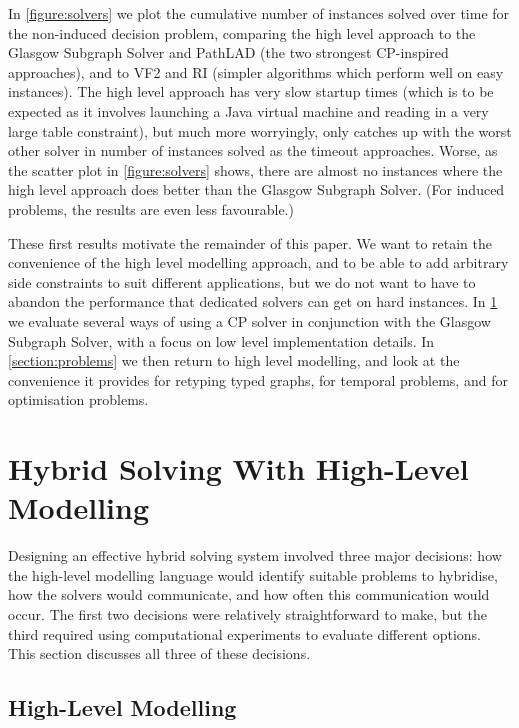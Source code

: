 \documentclass[runningheads]{llncs}
\begin{document}
In \cref{figure:solvers} we plot the cumulative number of instances solved over time for the
non-induced decision problem, comparing the high level approach to the Glasgow Subgraph Solver
\cite{DBLP:conf/gg/McCreeshP020} and PathLAD \cite{DBLP:conf/lion/KotthoffMS16} (the two strongest
CP-inspired approaches), and to VF2 \cite{DBLP:journals/pami/CordellaFSV04} and RI
\cite{DBLP:journals/bmcbi/BonniciGPSF13} (simpler algorithms which perform well on easy instances).
The high level approach has very slow startup times (which is to be expected as it involves
launching a Java virtual machine and reading in a very large table constraint), but much more
worryingly, only catches up with the worst other solver in number of instances solved as the timeout
approaches. Worse, as the scatter plot in \cref{figure:solvers} shows, there are almost no instances
where the high level approach does better than the Glasgow Subgraph Solver. (For induced problems,
the results are even less favourable.)

These first results motivate the remainder of this paper. We want to retain the convenience of the
high level modelling approach, and to be able to add arbitrary side constraints to suit different
applications, but we do not want to have to abandon the performance that dedicated solvers can get
on hard instances. In \cref{section:hybrid} we evaluate several ways of using a CP solver in
conjunction with the Glasgow Subgraph Solver, with a focus on low level implementation details. In
\cref{section:problems} we then return to high level modelling, and look at the convenience it
provides for retyping typed graphs, for temporal problems, and for optimisation problems.

\section{Hybrid Solving With High-Level Modelling}\label{section:hybrid}

Designing an effective hybrid solving system involved three major decisions: how the high-level
modelling language would identify suitable problems to hybridise, how the solvers would communicate,
and how often this communication would occur. The first two decisions were relatively
straightforward to make, but the third required using computational experiments to evaluate
different options. This section discusses all three of these decisions.

\subsection{High-Level Modelling}
\end{document}
